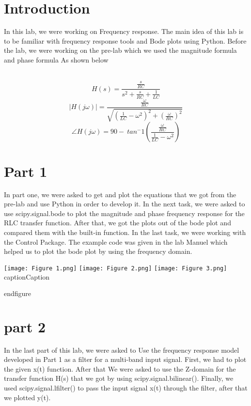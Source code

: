 \documentclass[12pt]{report}
\begin{document}
\section{Introduction}

In this lab, we were working on Frequency response.  The main idea of this lab is to be familiar with frequency response tools and Bode plots using Python.  Before the lab, we were working on the pre-lab which we used the magnitude formula and phase formula As shown below 


\\
$$H(s) = \frac{\frac{s}{RC}}{s^2+\frac{s}{RC}+\frac{1}{LC}}$$
$$|H(j\omega)| = \frac{\frac{\omega}{RC}}{\sqrt{(\frac{1}{LC}-\omega^2)^2+(\frac{\omega}{RC})^2}}$$
$$\angle H(j\omega) = 90- \ tan^-1(\frac{\frac{\omega}{RC}}{\frac{1}{LC}-\omega^2})$$






\section{Part 1}

In part one, we were asked to get and plot the equations that we got from the pre-lab and use Python in order to develop it. In the next task, we were asked to use scipy.signal.bode to plot the magnitude and phase frequency response for the RLC transfer function.  After that, we got the plots out of the bode plot and compared them with the built-in function. In the last task, we were working with the Control Package. The example code was given in the lab Manuel which helped us to plot the bode plot by using the frequency domain.

    






\texttt{[image: Figure 1.png]} 
\texttt{[image: Figure 2.png]} 
\texttt{[image: Figure 3.png]} 
  caption{Caption}

  end{figure}﻿


\section{part 2}

In the last part of this lab, we were asked to Use the frequency response model developed in Part 1 as a filter for a multi-band input signal. First, we had to plot the given x(t) function. After that We were asked to use the Z-domain for the transfer function H(s) that we got by using scipy.signal.bilinear(). Finally, we used scipy.signal.lfilter() to pass the input signal x(t) through the filter, after that we plotted y(t).
\end{document}
